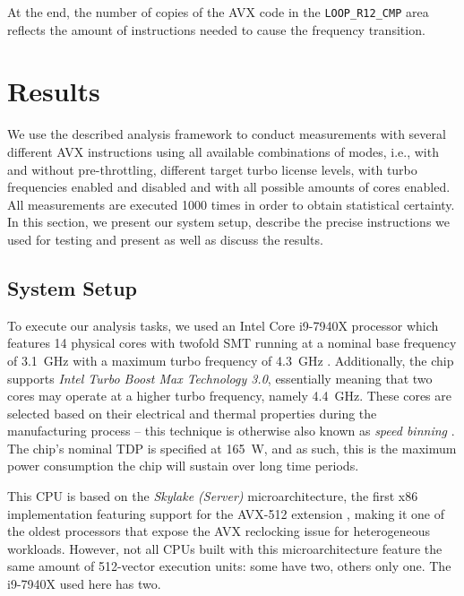 At the end, the number of copies of the \gls{AVX} code in the \texttt{LOOP\_R12\_CMP} area reflects the amount of instructions needed to cause the frequency transition.

\section{Results}
\label{sec:analysis:results}

We use the described analysis framework to conduct measurements with several different \gls{AVX} instructions using all available combinations of modes, i.e., with and without pre-throttling, different target turbo license levels, with turbo frequencies enabled and disabled and with all possible amounts of cores enabled. All measurements are executed 1000 times in order to obtain statistical certainty. In this section, we present our system setup, describe the precise instructions we used for testing and present as well as discuss the results.

\subsection{System Setup}
\label{sec:analysis:results:systemsetup}

To execute our analysis tasks, we used an Intel Core i9-7940X processor which features 14 physical cores with twofold \gls{SMT} running at a nominal base frequency of \SI{3.1}{\giga\hertz} with a maximum turbo frequency of \SI{4.3}{\giga\hertz} \cite{intel7940x}. Additionally, the chip supports \textit{Intel Turbo Boost Max Technology 3.0}, essentially meaning that two cores may operate at a higher turbo frequency, namely \SI{4.4}{\giga\hertz}. These cores are selected based on their electrical and thermal properties during the manufacturing process \cite{intelxeonscalabledeepdive} -- this technique is otherwise also known as \textit{speed binning} \cite{lopata2012speed}. The chip's nominal \gls{TDP} is specified at \SI{165}{\watt}, and as such, this is the maximum power consumption the chip will sustain over long time periods.

This \gls{CPU} is based on the \textit{Skylake (Server)} microarchitecture, the first x86 implementation featuring support for the \gls{AVX-512} extension \cite{intelxeonscalabledeepdive}, making it one of the oldest processors that expose the \gls{AVX} reclocking issue for heterogeneous workloads. However, not all \glspl{CPU} built with this microarchitecture feature the same amount of \SI{512}{\bit}-vector execution units: some have two, others only one. The i9-7940X used here has two.

